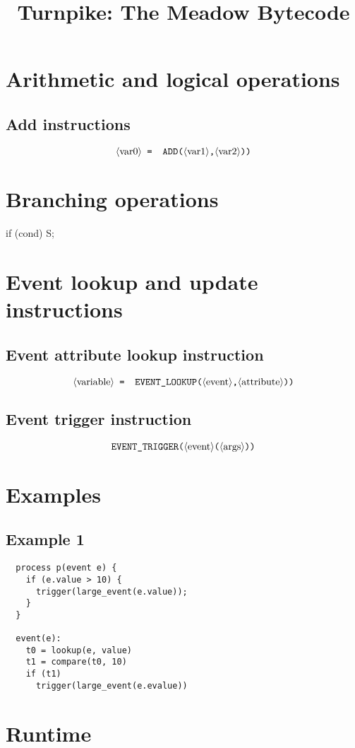 \documentclass{myproc}
\begin{document}
\small

\title{\large\bf{}Turnpike: The Meadow Bytecode}
\author{}
\maketitle

\section{Arithmetic and logical operations}
\subsection{Add instructions}
\[
  \mbox{$\langle{\textit{\mbox{\em{}var0}}}\rangle$} 
  \mbox{\tt{} = } 
  \mbox{\tt{} ADD(} 
  \mbox{$\langle{\textit{\mbox{\em{}var1}}}\rangle$} 
  \mbox{\tt{},}  
  \mbox{$\langle{\textit{\mbox{\em{}var2}}}\rangle$} 
  \mbox{\tt{}))}
\]

\section{Branching operations}
\bit
\w if (cond) S;
\eit

\section{Event lookup and update instructions}
\subsection{Event attribute lookup instruction}
\[
  \mbox{$\langle{\textit{\mbox{\em{}variable}}}\rangle$} 
  \mbox{\tt{} = } 
  \mbox{\tt{} EVENT\_LOOKUP(} 
  \mbox{$\langle{\textit{\mbox{\em{}event}}}\rangle$} 
  \mbox{\tt{},}  
  \mbox{$\langle{\textit{\mbox{\em{}attribute}}}\rangle$} 
  \mbox{\tt{}))}
\]

\subsection{Event trigger instruction}
\[
  \mbox{\tt{}EVENT\_TRIGGER(} \mbox{$\langle{\textit{\mbox{\em{}event}}}\rangle$} 
  \mbox{\tt{}(}  
  \mbox{$\langle{\textit{\mbox{\em{}args}}}\rangle$} 
  \mbox{\tt{}))}
\]


\section{Examples}
\subsection{Example 1}
\begin{verbatim}
  process p(event e) {
    if (e.value > 10) {
      trigger(large_event(e.value));
    }
  }

  event(e): 
    t0 = lookup(e, value)
    t1 = compare(t0, 10)
    if (t1)
      trigger(large_event(e.evalue))
\end{verbatim}

\section{Runtime}
\end{document}
